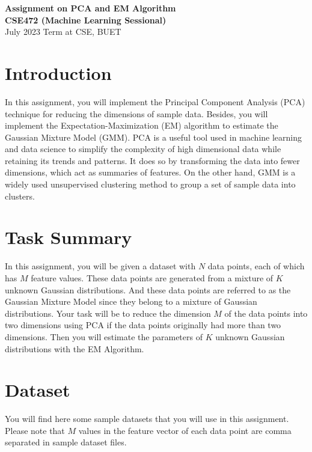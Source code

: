 \documentclass[11pt, a4paper]{article}
\begin{document}
\begin{center}
    \textbf{\Large Assignment on PCA and EM Algorithm} \\[0.5em]
    \textbf{CSE472 (Machine Learning Sessional)} \\[0.5em]
    \normalsize July 2023 Term at CSE, BUET
\end{center}

\vspace{1em}

\section{Introduction}
In this assignment, you will implement the Principal Component Analysis (PCA) technique for reducing the dimensions of sample data. Besides, you will implement the Expectation-Maximization (EM) algorithm to estimate the Gaussian Mixture Model (GMM). PCA is a useful tool used in machine learning and data science to simplify the complexity of high dimensional data while retaining its trends and patterns. It does so by transforming the data into fewer dimensions, which act as summaries of features. On the other hand, GMM is a widely used unsupervised clustering method to group a set of sample data into clusters.

\section{Task Summary}
In this assignment, you will be given a dataset with $N$ data points, each of which has $M$ feature values. These data points are generated from a mixture of $K$ unknown Gaussian distributions. And these data points are referred to as the Gaussian Mixture Model since they belong to a mixture of Gaussian distributions. Your task will be to reduce the dimension $M$ of the data points into two dimensions using PCA if the data points originally had more than two dimensions. Then you will estimate the parameters of $K$ unknown Gaussian distributions with the EM Algorithm.

\section{Dataset}
You will find here some sample datasets that you will use in this assignment. Please note that $M$ values in the feature vector of each data point are comma separated in sample dataset files.
\end{document}
